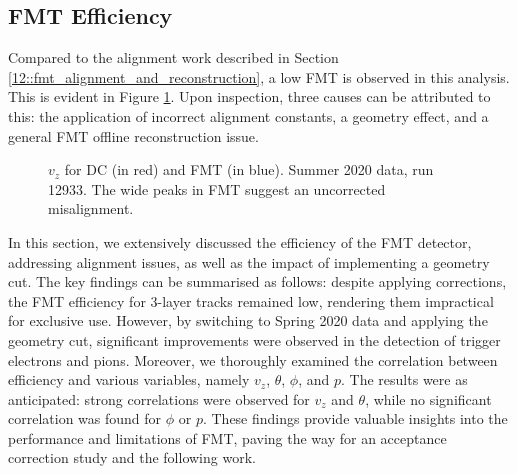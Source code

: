 \subsection{FMT Efficiency}
\label{14.10::fmt_efficiency}
    Compared to the alignment work described in Section \ref{12::fmt_alignment_and_reconstruction}, a low FMT is observed in this analysis.
    This is evident in Figure \ref{fig::14.10::vz_012933}.
    Upon inspection, three causes can be attributed to this: the application of incorrect alignment constants, a geometry effect, and a general FMT offline reconstruction issue.

    \begin{figure}[b!]
        \centering{}
        \caption[$v_z$ for DC and FMT, run 12933]{$v_z$ for DC (in red) and FMT (in blue). Summer 2020 data, run 12933. The wide peaks in FMT suggest an uncorrected misalignment.}
        \label{fig::14.10::vz_012933}
    \end{figure}

    In this section, we extensively discussed the efficiency of the FMT detector, addressing alignment issues, as well as the impact of implementing a geometry cut.
    The key findings can be summarised as follows: despite applying corrections, the FMT efficiency for 3-layer tracks remained low, rendering them impractical for exclusive use.
    However, by switching to Spring 2020 data and applying the geometry cut, significant improvements were observed in the detection of trigger electrons and pions.
    Moreover, we thoroughly examined the correlation between efficiency and various variables, namely $v_z$, $\theta$, $\phi$, and $p$.
    The results were as anticipated: strong correlations were observed for $v_z$ and $\theta$, while no significant correlation was found for $\phi$ or $p$.
    These findings provide valuable insights into the performance and limitations of FMT, paving the way for an acceptance correction study and the following work.

    
    
    
    
